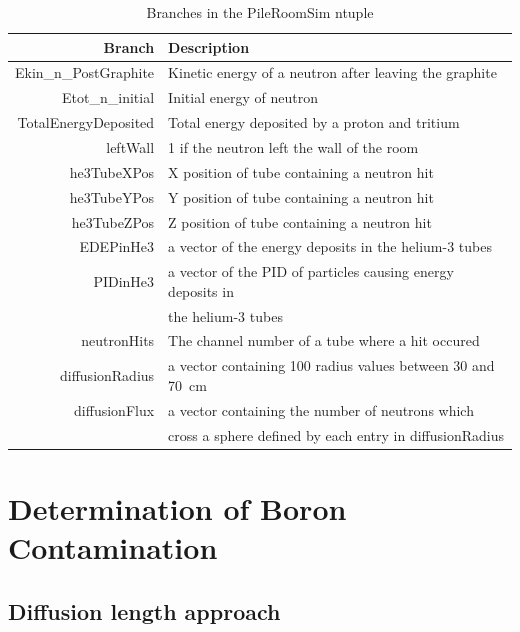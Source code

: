 \documentclass{article}
\begin{document}
	
\begin{table}
	\centering
	\begin{tabular}{ rl }
		Branch	&	Description	\\	\hline	\hline
Ekin\_n\_PostGraphite	&	Kinetic energy of a neutron after leaving the graphite	\\		
Etot\_n\_initial	&	Initial energy of neutron	\\		
TotalEnergyDeposited	&	Total energy deposited by a proton and tritium	\\		
leftWall	&	1 if the neutron left the wall of the room	\\		
he3TubeXPos	&	X position of tube containing a neutron hit	\\		
he3TubeYPos	&	Y position of tube containing a neutron hit	\\		
he3TubeZPos	&	Z position of tube containing a neutron hit	\\		
EDEPinHe3	&	a vector of the energy deposits in the helium-3 tubes	\\		
PIDinHe3	&	a vector of the PID of particles causing energy deposits in 	\\		
	&	the helium-3 tubes	\\		
neutronHits	&	The channel number of a tube where a hit occured	\\		
diffusionRadius	&	a vector containing 100 radius values between 30 and 70~cm	\\		
diffusionFlux	&	a vector containing the number of neutrons which 	\\		
	&	cross a sphere defined by each entry in diffusionRadius	\\	\hline	

	
	\end{tabular}
	\caption{Branches in the PileRoomSim ntuple}
	\label{tab:branches}
\end{table}	




\section{Determination of Boron Contamination}

\subsection{Diffusion length approach}
\end{document}
